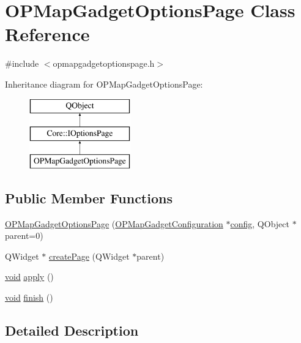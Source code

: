 \hypertarget{class_o_p_map_gadget_options_page}{\section{O\-P\-Map\-Gadget\-Options\-Page Class Reference}
\label{class_o_p_map_gadget_options_page}
}


{\ttfamily \#include $<$opmapgadgetoptionspage.\-h$>$}

Inheritance diagram for O\-P\-Map\-Gadget\-Options\-Page\-:\begin{figure}[H]
\begin{center}
\leavevmode
\includegraphics[height=3.000000cm]{class_o_p_map_gadget_options_page}
\end{center}
\end{figure}
\subsection*{Public Member Functions}
\begin{DoxyCompactItemize}
\item 
\hyperlink{group___o_p_map_plugin_ga23f0a8c69cfb41e42f3304d1b4a4cd34}{O\-P\-Map\-Gadget\-Options\-Page} (\hyperlink{class_o_p_map_gadget_configuration}{O\-P\-Map\-Gadget\-Configuration} $\ast$\hyperlink{deflate_8c_a4473b5227787415097004fd39f55185e}{config}, Q\-Object $\ast$parent=0)
\item 
Q\-Widget $\ast$ \hyperlink{group___o_p_map_plugin_gaec7ef2751680eb7ff0f4f6abdf2fd4c4}{create\-Page} (Q\-Widget $\ast$parent)
\item 
\hyperlink{group___u_a_v_objects_plugin_ga444cf2ff3f0ecbe028adce838d373f5c}{void} \hyperlink{group___o_p_map_plugin_ga8b2ec9377a2fb5a144b5c5aab349225f}{apply} ()
\item 
\hyperlink{group___u_a_v_objects_plugin_ga444cf2ff3f0ecbe028adce838d373f5c}{void} \hyperlink{group___o_p_map_plugin_ga7d645e14473ae14e762cc694e85e28a8}{finish} ()
\end{DoxyCompactItemize}


\subsection{Detailed Description}


